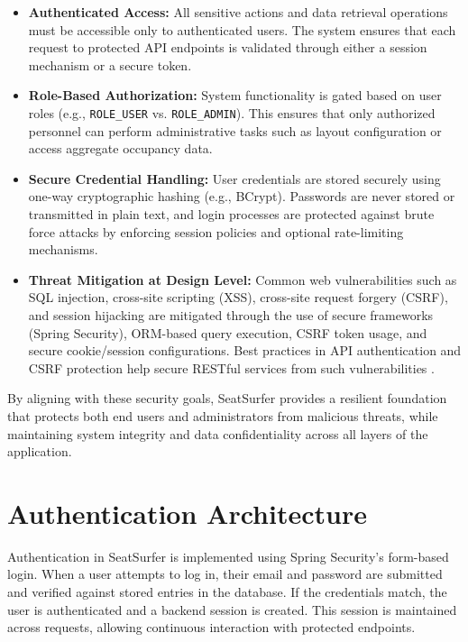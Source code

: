 \documentclass[12pt,a4paper]{report} %
\begin{document}
\begin{itemize}
    \item \textbf{Authenticated Access:} All sensitive actions and data retrieval operations must be accessible only to authenticated users. The system ensures that each request to protected API endpoints is validated through either a session mechanism or a secure token.
    
    \item \textbf{Role-Based Authorization:} System functionality is gated based on user roles (e.g., \verb|ROLE_USER| vs. \verb|ROLE_ADMIN|). This ensures that only authorized personnel can perform administrative tasks such as layout configuration or access aggregate occupancy data.
    
    \item \textbf{Secure Credential Handling:} User credentials are stored securely using one-way cryptographic hashing (e.g., BCrypt). Passwords are never stored or transmitted in plain text, and login processes are protected against brute force attacks by enforcing session policies and optional rate-limiting mechanisms.
    
    \item \textbf{Threat Mitigation at Design Level:} Common web vulnerabilities such as SQL injection, cross-site scripting (XSS), cross-site request forgery (CSRF), and session hijacking are mitigated through the use of secure frameworks (Spring Security), ORM-based query execution, CSRF token usage, and secure cookie/session configurations. Best practices in API authentication and CSRF protection help secure RESTful services from such vulnerabilities \cite{sharma2023privacy}.
\end{itemize}

By aligning with these security goals, SeatSurfer provides a resilient foundation that protects both end users and administrators from malicious threats, while maintaining system integrity and data confidentiality across all layers of the application.

\section{Authentication Architecture}

Authentication in SeatSurfer is implemented using Spring Security's form-based login. When a user attempts to log in, their email and password are submitted and verified against stored entries in the database. If the credentials match, the user is authenticated and a backend session is created. This session is maintained across requests, allowing continuous interaction with protected endpoints.
\end{document}

